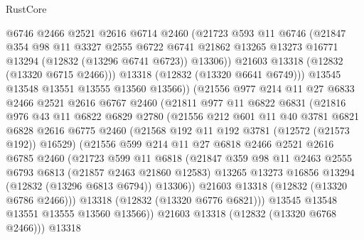 \begin{lexlean}{RustCore}
\begin{coremodule}
              @6746
              @2466
              @2521
              @2616
              @6714
              @2460
              (@21723
                @593
                @11
                @6746
                (@21847
                  @354
                  @98
                  @11
                  @3327
                  @2555
                  @6722
                  @6741
                  @21862
                  @13265
                  @13273
                  @16771
                  @13294
                  (@12832 (@13296 @6741 @6723))
                  @13306))
              @21603
              @13318
              (@12832 (@13320 @6715 @2466)))
            @13318
            (@12832 (@13320 @6641 @6749)))
          @13545
          @13548
          @13551
          @13555
          @13560
          @13566))
      (@21556
        @977
        @214
        @11
        @27
        @6833
        @2466
        @2521
        @2616
        @6767
        @2460
        (@21811
          @977
          @11
          @6822
          @6831
          (@21816
            @976
            @43
            @11
            @6822
            @6829
            @2780
            (@21556
              @212
              @601
              @11
              @40
              @3781
              @6821
              @6828
              @2616
              @6775
              @2460
              (@21568 @192 @11 @192 @3781 (@12572 (@21573 @192)) @16529)
              (@21556
                @599
                @214
                @11
                @27
                @6818
                @2466
                @2521
                @2616
                @6785
                @2460
                (@21723
                  @599
                  @11
                  @6818
                  (@21847
                    @359
                    @98
                    @11
                    @2463
                    @2555
                    @6793
                    @6813
                    (@21857 @2463 @21860 @12583)
                    @13265
                    @13273
                    @16856
                    @13294
                    (@12832 (@13296 @6813 @6794))
                    @13306))
                @21603
                @13318
                (@12832 (@13320 @6786 @2466)))
              @13318
              (@12832 (@13320 @6776 @6821)))
            @13545
            @13548
            @13551
            @13555
            @13560
            @13566))
        @21603
        @13318
        (@12832 (@13320 @6768 @2466)))
      @13318

\end{coremodule}
\end{lexlean}
